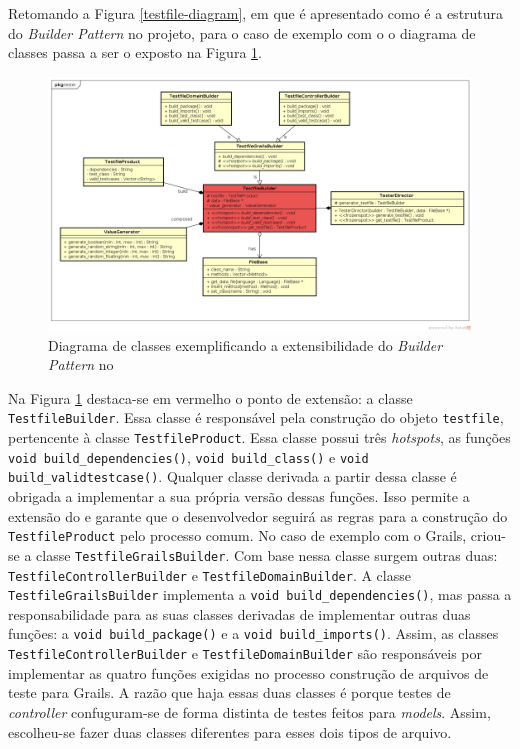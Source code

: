 Retomando a Figura \ref{testfile-diagram}, em que é apresentado como é a
estrutura do \textit{Builder Pattern} no projeto, para o caso de exemplo
com o \grails o diagrama de classes passa a ser o exposto na Figura
\ref{testfile-grails-class-diagram}.

\begin{figure}[h]
  \centering
    \includegraphics[width=\textwidth]{figuras/testfile-grails-class-diagram.png}
    \caption{Diagrama de classes exemplificando a extensibilidade do \textit{Builder Pattern} no \framework}
    \label{testfile-grails-class-diagram}
\end{figure}
\FloatBarrier

Na Figura \ref{testfile-grails-class-diagram} destaca-se em vermelho
o ponto de extensão: a classe \lstinline|TestfileBuilder|. Essa classe é responsável
pela construção do objeto \lstinline|testfile|, pertencente à classe
\lstinline|TestfileProduct|. Essa classe possui três \textit{hotspots}, as funções
\lstinline|void build_dependencies()|, \lstinline|void build_class()| e
\lstinline|void build_validtestcase()|. Qualquer classe derivada a partir dessa classe é
obrigada a implementar a sua própria versão dessas funções. Isso permite a extensão
do \framework e garante que o desenvolvedor seguirá as regras para a construção do
\lstinline|TestfileProduct| pelo processo comum. No caso de exemplo com o
\textsf{Grails}, criou-se a classe \lstinline|TestfileGrailsBuilder|. Com base
nessa classe surgem outras duas: \lstinline|TestfileControllerBuilder| e
\lstinline|TestfileDomainBuilder|. A classe \lstinline|TestfileGrailsBuilder|
implementa a \lstinline|void build_dependencies()|, mas passa a responsabilidade
para as suas classes derivadas de implementar outras duas funções: a
\lstinline|void build_package()| e a \lstinline|void build_imports()|. Assim,
as classes \lstinline|TestfileControllerBuilder| e \lstinline|TestfileDomainBuilder|
são responsáveis por implementar as quatro funções exigidas no processo
construção de arquivos de teste para \textsf{Grails}. A razão que haja essas
duas classes é porque testes de \textit{controller} confuguram-se de forma
distinta de testes feitos para \textit{models}. Assim, escolheu-se fazer duas classes
diferentes para esses dois tipos de arquivo.

